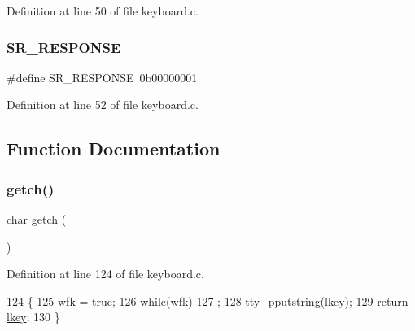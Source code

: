Definition at line 50 of file keyboard.\+c.

\mbox{\label{a00038_ac9efa716f8185bae296975136b510c30_ac9efa716f8185bae296975136b510c30}} 
\subsubsection{\texorpdfstring{S\+R\+\_\+\+R\+E\+S\+P\+O\+N\+SE}{SR\_RESPONSE}}
{\footnotesize\ttfamily \#define S\+R\+\_\+\+R\+E\+S\+P\+O\+N\+SE~0b00000001}



Definition at line 52 of file keyboard.\+c.



\subsection{Function Documentation}
\mbox{\label{a00038_af3facad10e05defa48d45b46eb9ebe7e_af3facad10e05defa48d45b46eb9ebe7e}} 
\subsubsection{\texorpdfstring{getch()}{getch()}}
{\footnotesize\ttfamily char getch (\begin{DoxyParamCaption}{ }\end{DoxyParamCaption})}



Definition at line 124 of file keyboard.\+c.


\begin{DoxyCode}
124              \{
125     \hyperlink{a00038_a6ddd5223379778858edc46ffbec19775_a6ddd5223379778858edc46ffbec19775}{wfk} = \textcolor{keyword}{true};
126     \textcolor{keywordflow}{while}(\hyperlink{a00038_a6ddd5223379778858edc46ffbec19775_a6ddd5223379778858edc46ffbec19775}{wfk})
127         ;
128     \hyperlink{a00149_ade960b1320324706aac6c00cc6b1b2fe_ade960b1320324706aac6c00cc6b1b2fe}{tty\_pputstring}(\hyperlink{a00038_ade374650022cb30c4f5591a8dafad685_ade374650022cb30c4f5591a8dafad685}{lkey});
129     \textcolor{keywordflow}{return} \hyperlink{a00038_ade374650022cb30c4f5591a8dafad685_ade374650022cb30c4f5591a8dafad685}{lkey};
130 \}
\end{DoxyCode}
\mbox{\label{a00038_ab88a2e96bbe585e228a5b201435c0240_ab88a2e96bbe585e228a5b201435c0240}} 
